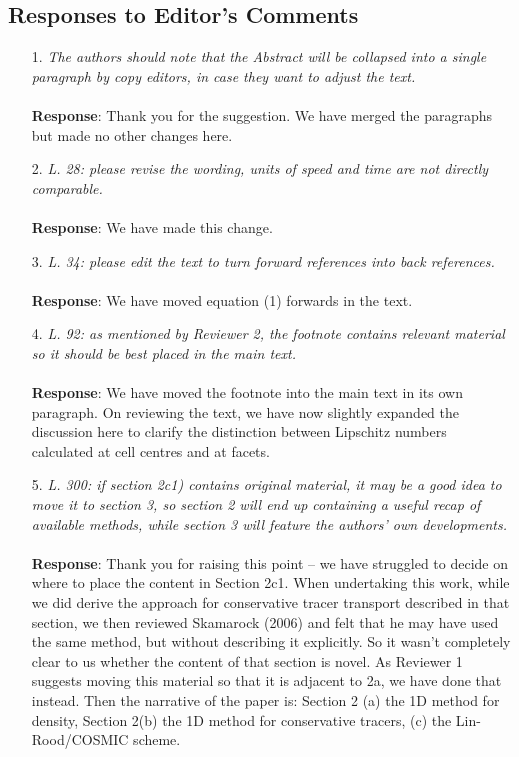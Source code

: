 \documentclass[11pt,a4paper]{article}
\begin{document}
\subsection*{Responses to Editor's Comments}
\begin{enumerate}[leftmargin=*]
\item[1.] \textit{The authors should note that the Abstract will be collapsed into a single paragraph by copy editors, in case they want to adjust the text.} \\
\\
\textbf{Response}: Thank you for the suggestion. We have merged the paragraphs but made no other changes here.

\item[2.] \textit{L. 28: please revise the wording, units of speed and time are not directly comparable.} \\
\\
\textbf{Response}: We have made this change.

\item[3.] \textit{L. 34: please edit the text to turn forward references into back references.} \\
\\
\textbf{Response}: We have moved equation (1) forwards in the text.

\item[4.] \textit{L. 92: as mentioned by Reviewer 2, the footnote contains relevant material so it should be best placed in the main text.} \\
\\
\textbf{Response}: We have moved the footnote into the main text in its own paragraph. On reviewing the text, we have now slightly expanded the discussion here to clarify the distinction between Lipschitz numbers calculated at cell centres and at facets.

\item[5.] \textit{L. 300: if section 2c1) contains original material, it may be a good idea to move it to section 3, so section 2 will end up containing a useful recap of available methods, while section 3 will feature the authors' own developments.} \\
\\
\textbf{Response}: Thank you for raising this point -- we have struggled to decide on where to place the content in Section 2c1. When undertaking this work, while we did derive the approach for conservative tracer transport described in that section, we then reviewed Skamarock (2006) and felt that he may have used the same method, but without describing it explicitly. So it wasn't completely clear to us whether the content of that section is novel.
As Reviewer 1 suggests moving this material so that it is adjacent to 2a, we have done that instead. Then the narrative of the paper is:
Section 2 (a) the 1D method for density, Section 2(b) the 1D method for conservative tracers, (c) the Lin-Rood/COSMIC scheme.


\end{enumerate}
\end{document}
